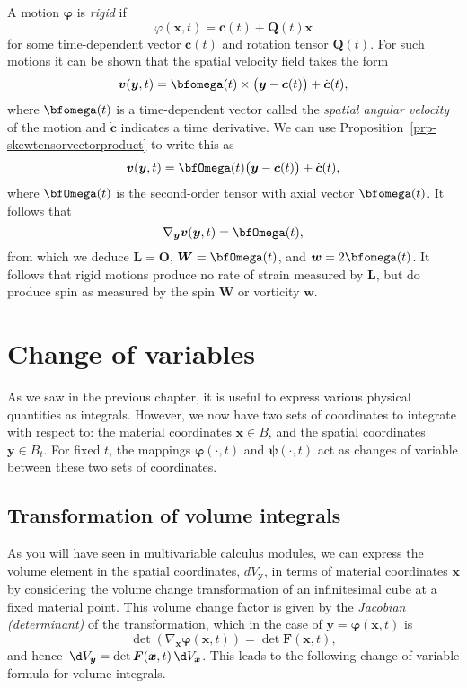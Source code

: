 \documentclass[
  letterpaper,
  DIV=11,
  numbers=noendperiod]{scrreprt}
\theoremstyle{plain}
\theoremstyle{remark}
\begin{document}
A motion \({\boldsymbol{\varphi}}\) is \emph{rigid} if
\[\varphi({\boldsymbol{x}},t) = {\boldsymbol{c}}(t)+{\boldsymbol{Q}}(t){\boldsymbol{x}}\]
for some time-dependent vector \({\boldsymbol{c}}(t)\) and rotation
tensor \({\boldsymbol{Q}}(t)\). For such motions it can be shown that
the spatial velocity field takes the form
\[{\boldsymbol{v}}({\boldsymbol{y}},t) = \bfomega(t)\times\big({\boldsymbol{y}}-{\boldsymbol{c}}(t)\big)+\dot{{\boldsymbol{c}}}(t),\]
where \(\bfomega(t)\) is a time-dependent vector called the
\emph{spatial angular velocity} of the motion and
\(\dot{{\boldsymbol{c}}}\) indicates a time derivative. We can use
Proposition~\ref{prp-skewtensorvectorproduct} to write this as
\[{\boldsymbol{v}}({\boldsymbol{y}},t) = \bfOmega(t)\big({\boldsymbol{y}}-{\boldsymbol{c}}(t)\big)+\dot{\boldsymbol{c}}(t),\]
where \(\bfOmega(t)\) is the second-order tensor with axial vector
\(\bfomega(t)\). It follows that
\[\nabla_{\boldsymbol{y}}{\boldsymbol{v}}({\boldsymbol{y}},t) = \bfOmega(t),\]
from which we deduce \({\boldsymbol{L}}= {\boldsymbol{O}}\),
\({\boldsymbol{W}}= \bfOmega(t)\), and
\({\boldsymbol{w}}= 2\bfomega(t)\). It follows that rigid motions
produce no rate of strain measured by \({\boldsymbol{L}}\), but do
produce spin as measured by the spin \({\boldsymbol{W}}\) or vorticity
\({\boldsymbol{w}}\).

\section{Change of variables}\label{change-of-variables}

As we saw in the previous chapter, it is useful to express various
physical quantities as integrals. However, we now have two sets of
coordinates to integrate with respect to: the material coordinates
\({\boldsymbol{x}}\in B\), and the spatial coordinates
\({\boldsymbol{y}}\in B_t\). For fixed \(t\), the mappings
\({\boldsymbol{\varphi}}(\cdot,t)\) and \({\boldsymbol{\psi}}(\cdot,t)\)
act as changes of variable between these two sets of coordinates.

\subsection{Transformation of volume
integrals}\label{transformation-of-volume-integrals}

As you will have seen in multivariable calculus modules, we can express
the volume element in the spatial coordinates, \(dV_{\boldsymbol{y}}\),
in terms of material coordinates \({\boldsymbol{x}}\) by considering the
volume change transformation of an infinitesimal cube at a fixed
material point. This volume change factor is given by the \emph{Jacobian
(determinant)} of the transformation, which in the case of
\({\boldsymbol{y}}= {\boldsymbol{\varphi}}({\boldsymbol{x}},t)\) is
\[\det(\nabla_{\boldsymbol{x}}{\boldsymbol{\varphi}}({\boldsymbol{x}},t))=\det{\boldsymbol{F}}({\boldsymbol{x}},t),\]
and hence
\({\,\d V_{{\boldsymbol{y}}}}= \det{\boldsymbol{F}}({\boldsymbol{x}},t){\,\d V_{{\boldsymbol{x}}}}\).
This leads to the following change of variable formula for volume
integrals.
\end{document}
